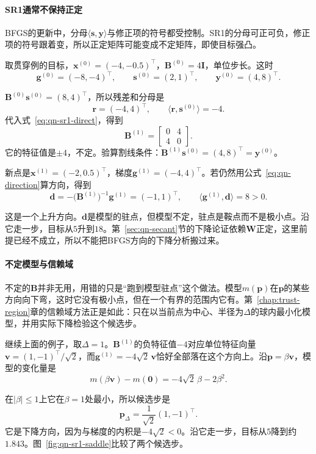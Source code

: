 \paragraph{SR1通常不保持正定}
BFGS的更新中，分母$\langle\bm{s},\bm{y}\rangle$与修正项的符号都受控制。SR1的分母可正可负，修正项的符号跟着变，所以正定矩阵可能变成不定矩阵，即使目标强凸。

取贯穿例的目标，$\bm{x}^{(0)}=(-4,-0.5)^\top$，$\bm{B}^{(0)}=4\bm{I}$，单位步长。这时
\[
 \bm{g}^{(0)}=(-8,-4)^\top,\qquad\bm{s}^{(0)}=(2,1)^\top,\qquad\bm{y}^{(0)}=(4,8)^\top.
\]

$\bm{B}^{(0)}\bm{s}^{(0)}=(8,4)^\top$，所以残差和分母是
\[
 \bm{r}=(-4,4)^\top,\qquad\langle\bm{r},\bm{s}^{(0)}\rangle=-4.
\]
代入式~\eqref{eq:qn-sr1-direct}，得到
\[
 \bm{B}^{(1)}=\begin{bmatrix}0&4\\4&0\end{bmatrix}.
\]
它的特征值是$\pm4$，不定。验算割线条件：$\bm{B}^{(1)}\bm{s}^{(0)}=(4,8)^\top=\bm{y}^{(0)}$。

新点是$\bm{x}^{(1)}=(-2,0.5)^\top$，梯度$\bm{g}^{(1)}=(-4,4)^\top$。若仍然用公式~\eqref{eq:qn-direction}算方向，得到
\[
 \bm{d}=-\bigl(\bm{B}^{(1)}\bigr)^{-1}\bm{g}^{(1)}=(-1,1)^\top,\qquad\langle\bm{g}^{(1)},\bm{d}\rangle=8>0.
\]

这是一个上升方向。$\bm{d}$是模型的驻点，但模型不定，驻点是鞍点而不是极小点。沿它走一步，目标从$5$升到$18$。第~\ref{sec:qn-secant}节的下降论证依赖$\bm{W}$正定，这里前提已经不成立，所以不能把BFGS方向的下降分析搬过来。

\paragraph{不定模型与信赖域}
不定的$\bm{B}$并非无用，用错的只是“跑到模型驻点”这个做法。模型$m(\bm{p})$在$\bm{p}$的某些方向向下弯，这时它没有极小点，但在一个有界的范围内它有。第~\ref{chap:trust-region}章的信赖域方法正是如此：只在以当前点为中心、半径为$\Delta$的球内最小化模型，并用实际下降检验这个候选步。

继续上面的例子，取$\Delta=1$。$\bm{B}^{(1)}$的负特征值$-4$对应单位特征向量$\bm{v}=(1,-1)^\top/\sqrt2$，而$\bm{g}^{(1)}=-4\sqrt2\,\bm{v}$恰好全部落在这个方向上。沿$\bm{p}=\beta\bm{v}$，模型的变化量是
\[
 m(\beta\bm{v})-m(\bm{0})=-4\sqrt2\,\beta-2\beta^2.
\]

在$\lvert\beta\rvert\leq1$上它在$\beta=1$处最小，所以候选步是
\[
 \bm{p}_{\Delta}=\frac{1}{\sqrt2}(1,-1)^\top.
\]
它是下降方向，因为与梯度的内积是$-4\sqrt2<0$。沿它走一步，目标从$5$降到约$1.843$。图~\ref{fig:qn-sr1-saddle}比较了两个候选步。

